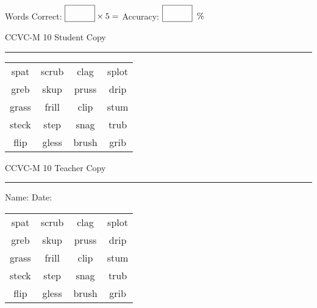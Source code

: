 \documentclass{memoir}
\begin{document}
\small

Words Correct: $\fbox{\phantom{\huge 100}} \times 5 = $ Accuracy: $\fbox{\phantom{\huge 100}}\;\; \%$ 

\vfill

\newpage


\footnotesize \noindent
CCVC-M 10 \hfill Student Copy
\smallskip
\hrule

\Large

\setlength{\tabcolsep}{14pt}
\def\arraystretch{3}

{\selectfont


\begin{vplace}[0.5]
\begin{center}
\begin{tabular}{cccc}
spat            & scrub & clag & splot \\
greb & skup & pruss       & drip \\
grass                    & frill & clip & stum \\
steck & step & snag & trub \\
flip & gless & brush & grib                    \\
\end{tabular}
\end{center}
\end{vplace}

}

\newpage

\footnotesize \noindent
CCVC-M 10 \hfill Teacher Copy
\smallskip
\hrule

\small

\vfill

\noindent
Name: \underline{\hspace{1.75in}} \hfill Date: \underline{\hspace{1in}}

\Large

{\selectfont


\begin{vplace}[0.5]
\begin{center}
\begin{tabular}{cccc}
spat            & scrub & clag & splot \\
greb & skup & pruss       & drip \\
grass                    & frill & clip & stum \\
steck & step & snag & trub \\
flip & gless & brush & grib                    \\
\end{tabular}
\end{center}
\end{vplace}



}
\end{document}
